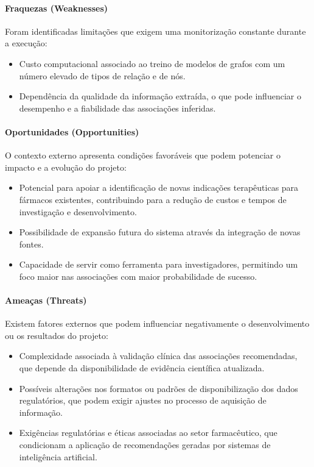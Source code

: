 \paragraph{Fraquezas (Weaknesses)}
Foram identificadas limitações que exigem uma monitorização constante durante a execução:
\begin{itemize}
    \item Custo computacional associado ao treino de modelos de grafos com um número elevado de tipos de relação e de nós.
    \item Dependência da qualidade da informação extraída, o que pode influenciar o desempenho e a fiabilidade das associações inferidas.
\end{itemize}

\paragraph{Oportunidades (Opportunities)}
O contexto externo apresenta condições favoráveis que podem potenciar o impacto e a evolução do projeto:
\begin{itemize}
    \item Potencial para apoiar a identificação de novas indicações terapêuticas para fármacos existentes, contribuindo para a redução de custos e tempos de investigação e desenvolvimento.
    \item Possibilidade de expansão futura do sistema através da integração de novas fontes.
    \item Capacidade de servir como ferramenta para investigadores, permitindo um foco maior nas associações com maior probabilidade de sucesso.
\end{itemize}

\paragraph{Ameaças (Threats)}
Existem fatores externos que podem influenciar negativamente o desenvolvimento ou os resultados do projeto:
\begin{itemize}
    \item Complexidade associada à validação clínica das associações recomendadas, que depende da disponibilidade de evidência científica atualizada.
    \item Possíveis alterações nos formatos ou padrões de disponibilização dos dados regulatórios, que podem exigir ajustes no processo de aquisição de informação.
    \item Exigências regulatórias e éticas associadas ao setor farmacêutico, que condicionam a aplicação de recomendações geradas por sistemas de inteligência artificial.
\end{itemize}

